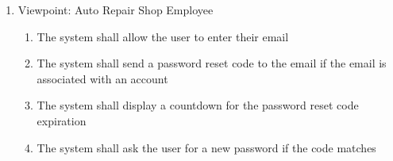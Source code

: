 \documentclass[12pt]{article}
\begin{document}
\begin{enumerate}[label=BE\arabic*., series=business_events]
\begin{enumerate}[VP\arabic*.]
		      \item Viewpoint: Auto Repair Shop Employee
		            \begin{enumerate}
			            \item The system shall allow the user to enter their email
			            \item The system shall send a password reset code to the email if the email is associated with an account
			            \item The system shall display a countdown for the password reset code expiration
			            \item The system shall ask the user for a new password if the code matches
		            \end{enumerate}
	      \end{enumerate}
\end{enumerate}
\end{document}
